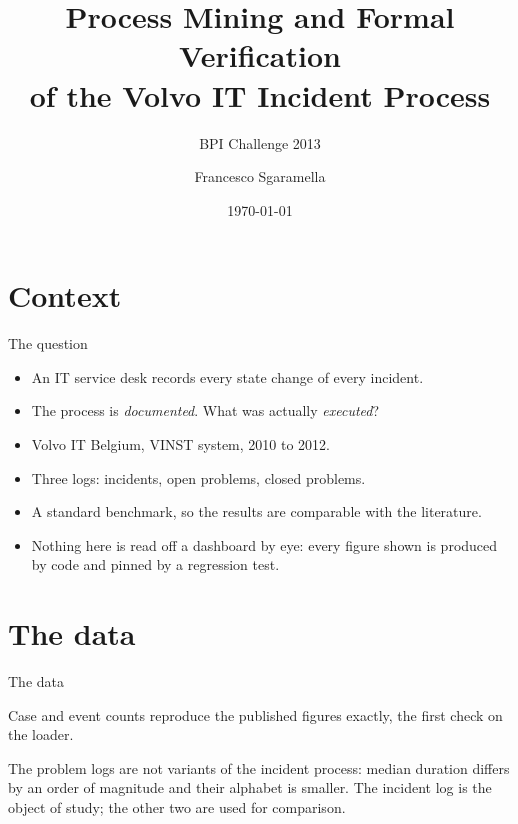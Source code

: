 \documentclass[aspectratio=169]{beamer}
\title[Process Mining, BPI 2013]{Process Mining and Formal Verification\\
       of the Volvo IT Incident Process}
\subtitle{BPI Challenge 2013}
\author{Francesco Sgaramella}
\date{\today}
\begin{document}
\frame{\titlepage}


\section{Context}


\begin{frame}{The question}
\begin{itemize}
  \item An IT service desk records every state change of every incident.
  \item The process is \emph{documented}. What was actually \emph{executed}?
  \bigskip
  \item Volvo IT Belgium, VINST system, 2010 to 2012.
  \item Three logs: incidents, open problems, closed problems.
  \item A standard benchmark, so the results are comparable with the literature.
  \bigskip
  \item Nothing here is read off a dashboard by eye: every figure shown is
        produced by code and pinned by a regression test.
\end{itemize}
\end{frame}

\section{The data}

\begin{frame}{The data}
\begin{center}\small\end{center}
\bigskip
\small
Case and event counts reproduce the published figures exactly, the first
check on the loader.
\bigskip

The problem logs are not variants of the incident process: median duration
differs by an order of magnitude and their alphabet is smaller. The incident log
is the object of study; the other two are used for comparison.
\end{frame}
\end{document}
